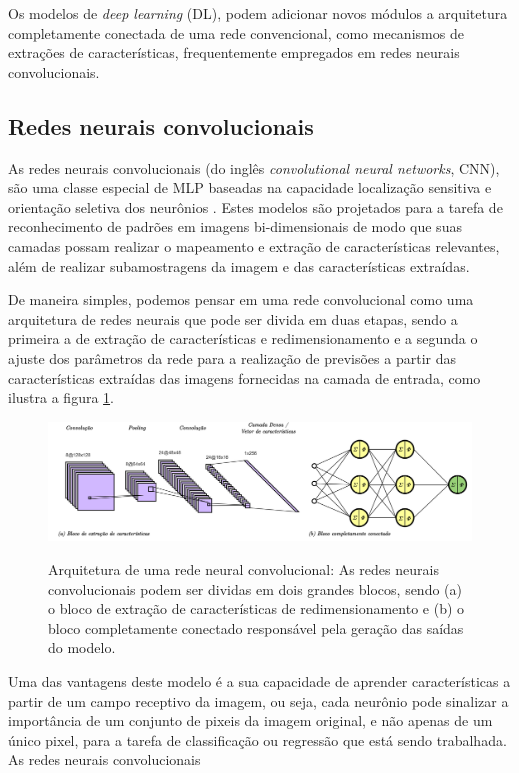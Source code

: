 Os modelos de \textit{deep learning} (DL), podem adicionar novos módulos a arquitetura completamente conectada de uma rede convencional, como mecanismos de extrações de características, frequentemente empregados em redes neurais convolucionais.

\subsection{Redes neurais convolucionais}

As redes neurais convolucionais (do inglês \textit{convolutional neural networks}, CNN), são uma classe especial de MLP baseadas na capacidade localização sensitiva e orientação seletiva dos neurônios \cite{haykinNeuralNetworksLearning2009}.
Estes modelos são projetados para a tarefa de reconhecimento de padrões em imagens bi-dimensionais de modo que suas camadas possam realizar o mapeamento e extração de características relevantes, além de realizar subamostragens da imagem e das características extraídas.

De maneira simples, podemos pensar em uma rede convolucional como uma arquitetura de redes neurais que pode ser divida em duas etapas, sendo a primeira a de extração de características e redimensionamento e a segunda o ajuste dos parâmetros da rede para a realização de previsões a partir das características extraídas das imagens fornecidas na camada de entrada, como ilustra a figura \ref{fig:cnn}.

\begin{figure}[htbp]
	\centering
	\caption{Arquitetura de uma rede neural convolucional: As redes neurais convolucionais podem ser dividas em dois grandes blocos, sendo (a) o bloco de extração de características de redimensionamento e (b) o bloco completamente conectado responsável pela geração das saídas do modelo.}
		\includegraphics[scale=.23]{imagens/cnn.png}
	\label{fig:cnn}
\end{figure}

Uma das vantagens deste modelo é a sua capacidade de aprender características a partir de um campo receptivo da imagem, ou seja, cada neurônio pode sinalizar a importância de um conjunto de pixeis da imagem original, e não apenas de um único pixel, para a tarefa de classificação ou regressão que está sendo trabalhada. As redes neurais convolucionais




